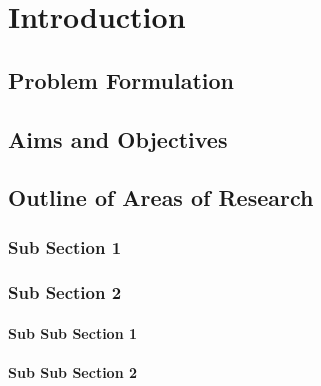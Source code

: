 \chapter{Introduction}
\label{chap:Introduction}

\section{Problem Formulation}

\section{Aims and Objectives}

\section{Outline of Areas of Research}

\subsection{Sub Section 1}

\subsection{Sub Section 2}

\subsubsection{Sub Sub Section 1}

\subsubsection{Sub Sub Section 2}

